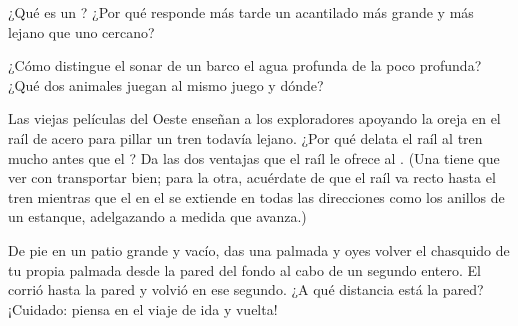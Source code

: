 \begin{exercise}[$\star$]\label{exo:g4:how-sound-travels:8}
¿Qué es un ? ¿Por qué responde más tarde un acantilado más grande
y más lejano que uno cercano?
\end{exercise}

\begin{exercise}[$\star$]\label{exo:g4:how-sound-travels:9}
¿Cómo distingue el sonar de un barco el agua profunda de la poco
profunda? ¿Qué dos animales juegan al mismo juego y dónde?
\end{exercise}

\begin{exercise}[$\star\star$]\label{exo:g4:how-sound-travels:10}
Las viejas películas del Oeste enseñan a los exploradores apoyando la
oreja en el raíl de acero para pillar un tren todavía lejano. ¿Por qué
delata el raíl al tren mucho antes que el ? Da las dos ventajas
que el raíl le ofrece al . (Una tiene que ver con transportar
bien; para la otra, acuérdate de que el raíl va recto hasta el tren
mientras que el  en el  se extiende en todas las
direcciones como los anillos de un estanque, adelgazando a medida que
avanza.)
\end{exercise}

\begin{exercise}[$\star\star$]\label{exo:g4:how-sound-travels:11}
De pie en un patio grande y vacío, das una palmada y oyes volver el
chasquido de tu propia palmada desde la pared del fondo al cabo de un
segundo entero. El  corrió hasta la pared y volvió en ese
segundo. ¿A qué distancia está la pared? ¡Cuidado: piensa en el viaje
de ida y vuelta!
\end{exercise}

